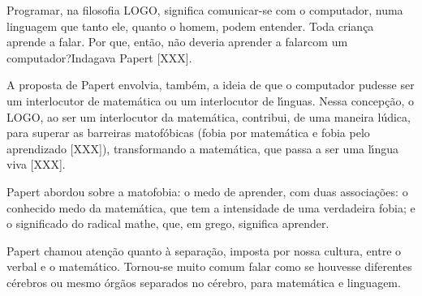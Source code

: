 \documentclass[
12pt,		%
openright,	%
twoside,  %
a4paper,			%
chapter=TITLE,		%
english,			%
french,				%
spanish,			%
brazil				%
]{USPSC-classe/USPSC}
\begin{document}
Programar, na filosofia LOGO, significa \textquotedbl comunicar-se com o computador, numa linguagem que tanto ele, quanto o homem,  podem entender\textquotedbl . Toda crian\c{c}a aprende a falar. Por que, ent\~ao, n\~ao deveria aprender a \textquotedbl falar\textquotedbl  com um computador?\textquotedbl  Indagava Papert [XXX].


A proposta de Papert envolvia, tamb\'em, a ideia de que o computador pudesse ser um interlocutor  de matem\'atica ou um interlocutor de l\'{\i}nguas. Nessa concep\c{c}\~ao, o LOGO, ao ser um interlocutor da matem\'atica, contribui, de uma maneira l\'udica, para superar as barreiras matof\'obicas (fobia por matem\'atica e fobia pelo aprendizado [XXX]), transformando a matem\'atica, que passa a ser uma l\'{\i}ngua viva [XXX].


Papert abordou sobre a \textquotedbl matofobia: o medo de aprender\textquotedbl , com duas associa\c{c}\~oes: o conhecido medo da matem\'atica, que tem a intensidade de uma verdadeira fobia; e o  significado do radical mathe, que, em grego, significa aprender.



\noindent\begin{center}\mbox{\centering{}}\end{center}


Papert chamou aten\c{c}\~ao quanto \`a separa\c{c}\~ao, imposta por nossa cultura, entre o verbal e o matem\'atico. Tornou-se muito comum falar como se houvesse diferentes c\'erebros ou mesmo \'org\~aos separados no c\'erebro, para matem\'atica e linguagem.
\end{document}
